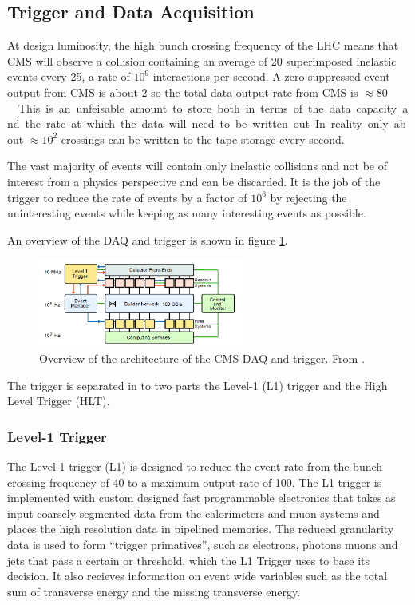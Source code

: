 \subsection{Trigger and Data Acquisition}
At design luminosity, the high bunch crossing frequency of the LHC means that
CMS will observe a collision containing an average of 20 superimposed inelastic
events every \unit{25}{\nano\second}, a rate of $10^{9}$ interactions per
second.
A zero suppressed event output from CMS is about \unit{2}{\mega \bel} so the total data
output rate from CMS is \unit{$\approx 80$}{\tera \bel \per \second}
This is an unfeisable amount to store both in terms of the data capacity and the
rate at which the data will need to be written out.
In reality only about $\approx 10^{2}$ crossings can be written to the tape
storage every second. 

The vast majority of events will contain only inelastic collisions and not be of
interest from a physics perspective and can be discarded.  
It is the job of the trigger to reduce the rate of events
by a factor of $10^6$ by rejecting the uninteresting events while keeping as
many interesting events as possible.

An overview of the DAQ and trigger is shown in figure \ref{fig:CMSDAQ}.

\begin{figure}[htbp]
  \centering
  \includegraphics[width=0.6\textwidth]{CMSDAQ}
  \caption{Overview of the architecture of the CMS DAQ and trigger. From
  \label{fig:CMSDAQ}
\cite{cms}.}
\end{figure}

The trigger is separated in to two parts the Level-1 (L1) trigger and the High
Level Trigger (HLT).\cite{cms}

\subsubsection{Level-1 Trigger}

The Level-1 trigger (L1) is designed to reduce the event rate from the bunch
crossing frequency of \unit{40}{\mega\hertz} to a maximum output rate of
\unit{100}{\kilo\hertz}.
The L1 trigger is implemented with custom designed fast programmable electronics
 that takes as input coarsely segmented data from the calorimeters and muon systems and
places the high resolution data in pipelined memories. The reduced granularity
data is used to form ``trigger primatives'', such as electrons, photons muons
and jets that pass a certain \PT or \ET threshold, which the L1 Trigger uses to
base its decision. It also recieves information on event wide variables such as
the total sum of transverse energy and the missing transverse energy.

